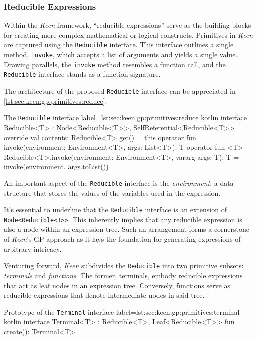 \subsubsection{Reducible Expressions}
  Within the \textit{Keen} framework, \enquote{reducible expressions} serve as
  the building blocks for creating more complex mathematical or logical 
  constructs. Primitives in \textit{Keen} are captured using the 
  \texttt{Reducible} interface. This interface outlines a single method, 
  \texttt{invoke}, which accepts a list of arguments and yields a single 
  value. Drawing parallels, the \texttt{invoke} method resembles a function 
  call, and the \texttt{Reducible} interface stands as a function signature.

  The architecture of the proposed \texttt{Reducible} interface can be 
  appreciated in \vref{lst:sec:keen:gp:primitives:reduce}.

  \begin{code}{
    The \texttt{Reducible} interface
  }{
    label=lst:sec:keen:gp:primitives:reduce
  }{kotlin}
    interface Reducible<T> : Node<Reducible<T>>, SelfReferential<Reducible<T>> {
        override val contents: Reducible<T> get() = this
        operator fun invoke(environment: Environment<T>, args: List<T>): T
        operator fun <T> Reducible<T>.invoke(environment: Environment<T>, vararg args: T): T =
            invoke(environment, args.toList())
    }
  \end{code}

  An important aspect of the \texttt{Reducible} interface is the 
  \emph{environment}; a data structure that stores the values of the
  variables used in the expression.
  
  It's essential to underline that the \texttt{Reducible} interface is an extension of \texttt{Node<Reducible<T>>}. This 
  inherently implies that any reducible expression is also a node within an expression tree. Such an arrangement forms a 
  cornerstone of \textit{Keen}'s GP approach as it lays the foundation for generating expressions of arbitrary 
  intricacy.

  Venturing forward, \textit{Keen} subdivides the \texttt{Reducible} into 
  two primitive subsets: \emph{terminals} and \emph{functions}. The former, 
  terminals, embody reducible expressions that act as leaf nodes in an 
  expression tree. 
  Conversely, functions serve as reducible expressions that denote 
  intermediate nodes in said tree.

  \begin{code}{Prototype of the \texttt{Terminal} interface}{
    label=lst:sec:keen:gp:primitives:terminal
  }{kotlin}
    interface Terminal<T> : Reducible<T>, Leaf<Reducible<T>> {
        fun create(): Terminal<T>
    }
  \end{code}

